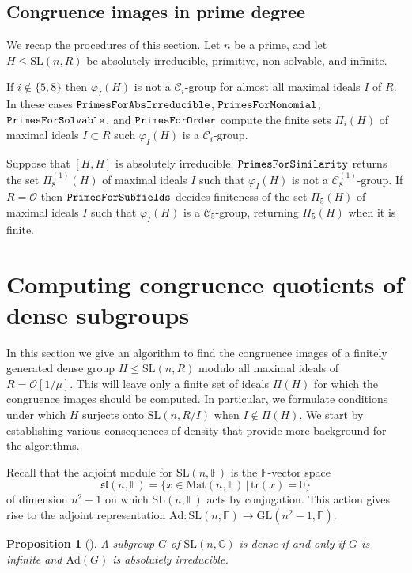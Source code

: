 \documentclass[11pt]{amsart}
\newtheorem{proposition}[theorem]{Proposition}
\theoremstyle{definition}
\theoremstyle{remark}
\newcommand{\F}{\mathbb{F}}
\newcommand{\C}{\mathbb{C}}
\newcommand{\GL}{\mathrm{GL}}
\newcommand{\SL}{\mathrm{SL}}
\newcommand{\tr}{\mathrm{tr}}
\newcommand{\Ad}{\mathrm{Ad}}
\newcommand{\calc}{\mathscr{C}}
\begin{document}
\subsection{Congruence images in prime degree}
\label{Summation}

We recap the procedures of this section. Let $n$ be a prime, and 
let $H \leq \SL(n, R)$ be absolutely irreducible, primitive, 
non-solvable, and infinite.

If $i\not \in \{5,8\}$ then $\varphi_I(H)$ is not a 
$\calc_i$-group for almost all maximal ideals $I$ of $R$. 
 In these cases ${\tt PrimesForAbsIrreducible}$,
 ${\tt PrimesForMonomial}$, 
 ${\tt PrimesForSolvable}$, and ${\tt PrimesForOrder}$
compute the finite sets $\Pi_i(H)$ of maximal ideals 
$I\subset R$ such $\varphi_I(H)$ is a $\calc_i$-group. 

Suppose that $[H,H]$ is absolutely irreducible.
 ${\tt PrimesForSimilarity}$ returns the set $\Pi_8^{(1)}(H)$
of maximal ideals $I$ such that 
$\varphi_I(H)$ is not a $\calc_8^{(1)}$-group.
If $R= \mathcal{O}$ then ${\tt PrimesForSubfields}$
decides finiteness of
the set $\Pi_5(H)$ of maximal ideals $I$ such that
$\varphi_I(H)$ is a $\calc_5$-group,
returning $\Pi_5(H)$ when it is finite.

\section{Computing congruence quotients of dense subgroups} 
\label{StrongAT}

In this section we give an algorithm to find the 
 congruence images of a finitely generated dense group 
$H\leq \SL(n, R)$ modulo all maximal ideals of $R=
\mathcal{O}[1/\mu]$. 
 This will leave only a finite set
 of ideals $\Pi(H)$ for which the congruence images
 should be computed.
In particular, we formulate conditions under which $H$ 
 surjects onto $\SL(n, R/I)$ when $I \notin \Pi(H)$.
We start by establishing various 
consequences of density 
that provide more background for the algorithms.

Recall that the adjoint module for $\SL(n, \F)$ is the 
$\F$-vector space 
\[
\mathfrak{sl}(n, \F) = 
\{x \in \mathrm{Mat}(n, \F) \, | \,
 \tr(x) = 0\}
\]
of dimension $n^2-1$ on which $\SL(n, \F)$ acts by conjugation.
This action gives rise to the  adjoint representation 
$\Ad \colon  \SL(n, \F) \rightarrow \GL(n^2-1, \F)$.
\begin{proposition}[{\cite[9.1]{Rivin}}]
\label{Rivin91}
A subgroup $G$ of $\SL(n,\C)$ is dense if and only 
if $G$ is infinite and $\Ad(G)$ is absolutely irreducible.
\end{proposition}
\end{document}
